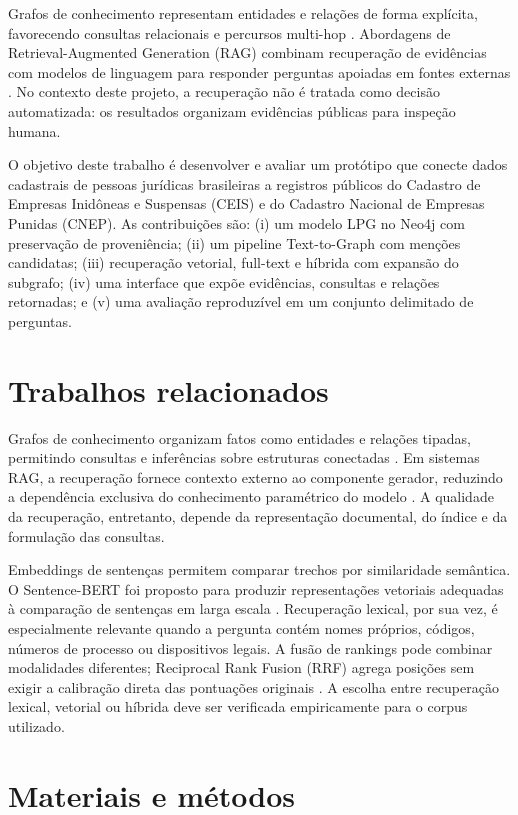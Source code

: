 \documentclass[12pt]{article}
\begin{document}
Grafos de conhecimento representam entidades e relações de forma explícita, favorecendo consultas relacionais e percursos multi-hop \cite{hogan2021}. Abordagens de Retrieval-Augmented Generation (RAG) combinam recuperação de evidências com modelos de linguagem para responder perguntas apoiadas em fontes externas \cite{lewis2020}. No contexto deste projeto, a recuperação não é tratada como decisão automatizada: os resultados organizam evidências públicas para inspeção humana.

O objetivo deste trabalho é desenvolver e avaliar um protótipo que conecte dados cadastrais de pessoas jurídicas brasileiras a registros públicos do Cadastro de Empresas Inidôneas e Suspensas (CEIS) e do Cadastro Nacional de Empresas Punidas (CNEP). As contribuições são: (i) um modelo LPG no Neo4j com preservação de proveniência; (ii) um pipeline Text-to-Graph com menções candidatas; (iii) recuperação vetorial, full-text e híbrida com expansão do subgrafo; (iv) uma interface que expõe evidências, consultas e relações retornadas; e (v) uma avaliação reproduzível em um conjunto delimitado de perguntas.

\section{Trabalhos relacionados}

Grafos de conhecimento organizam fatos como entidades e relações tipadas, permitindo consultas e inferências sobre estruturas conectadas \cite{hogan2021}. Em sistemas RAG, a recuperação fornece contexto externo ao componente gerador, reduzindo a dependência exclusiva do conhecimento paramétrico do modelo \cite{lewis2020}. A qualidade da recuperação, entretanto, depende da representação documental, do índice e da formulação das consultas.

Embeddings de sentenças permitem comparar trechos por similaridade semântica. O Sentence-BERT foi proposto para produzir representações vetoriais adequadas à comparação de sentenças em larga escala \cite{reimers2019}. Recuperação lexical, por sua vez, é especialmente relevante quando a pergunta contém nomes próprios, códigos, números de processo ou dispositivos legais. A fusão de rankings pode combinar modalidades diferentes; Reciprocal Rank Fusion (RRF) agrega posições sem exigir a calibração direta das pontuações originais \cite{cormack2009}. A escolha entre recuperação lexical, vetorial ou híbrida deve ser verificada empiricamente para o corpus utilizado.

\section{Materiais e métodos}
\end{document}
